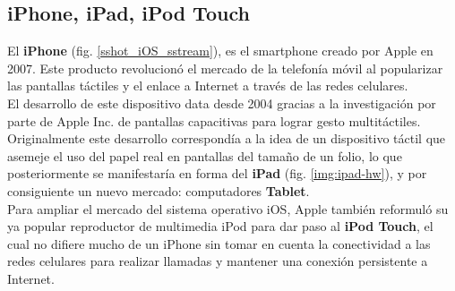 	

		\subsection{iPhone, iPad, iPod Touch}
		
El \textbf{iPhone} (fig. \ref{sshot_iOS_sstream}), es el smartphone creado por Apple en 2007. Este producto revolucionó el mercado de la telefonía móvil al popularizar las pantallas táctiles y el enlace a Internet a través de las redes celulares. \\

El desarrollo de este dispositivo data desde 2004 gracias a la investigación por parte de Apple Inc. de pantallas capacitivas para lograr gesto multitáctiles. Originalmente este desarrollo correspondía a la idea de un dispositivo táctil que asemeje el uso del papel real en pantallas del tamaño de un folio, lo que posteriormente se manifestaría en forma del \textbf{iPad} (fig. \ref{img:ipad-hw}), y por consiguiente un nuevo mercado: computadores \textbf{Tablet}.\\

Para ampliar el mercado del sistema operativo iOS, Apple también reformuló su ya popular reproductor de multimedia iPod para dar paso al \textbf{iPod Touch}, el cual no difiere mucho de un iPhone sin tomar en cuenta la conectividad a las redes celulares para realizar llamadas y mantener una conexión persistente a Internet.\\

